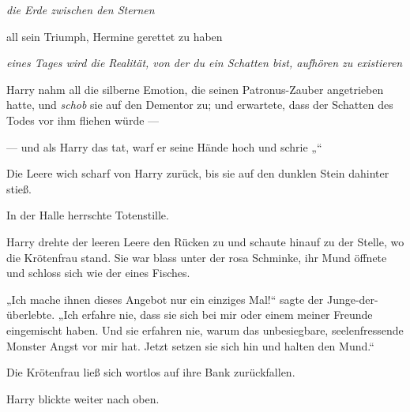 \emph{die Erde zwischen den Sternen}

all sein Triumph, Hermine gerettet zu haben

\emph{eines Tages wird die Realität, von der du ein Schatten bist, aufhören zu existieren}

Harry nahm all die silberne Emotion, die seinen Patronus-Zauber angetrieben hatte, und \emph{schob} sie auf den Dementor zu; und erwartete, dass der Schatten des Todes vor ihm fliehen würde —

— und als Harry das tat, warf er seine Hände hoch und schrie
„“

Die Leere wich scharf von Harry zurück, bis sie auf den dunklen Stein dahinter stieß.

In der Halle herrschte Totenstille.

Harry drehte der leeren Leere den Rücken zu und schaute hinauf zu der Stelle, wo die Krötenfrau stand. Sie war blass unter der rosa Schminke, ihr Mund öffnete und schloss sich wie der eines Fisches.

„Ich mache ihnen dieses Angebot nur ein einziges Mal!“ sagte der Junge-der-überlebte.
„Ich erfahre nie, dass sie sich bei mir oder einem meiner Freunde eingemischt haben. Und sie erfahren nie, warum das unbesiegbare, seelenfressende Monster Angst vor mir hat. Jetzt setzen sie sich hin und halten den Mund.“

Die Krötenfrau ließ sich wortlos auf ihre Bank zurückfallen.

Harry blickte weiter nach oben.

